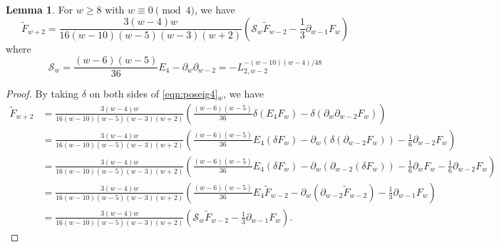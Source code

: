 \documentclass[10pt,reqno]{amsproc}
\newcommand{\1}{\mathds{1}}	%
\theoremstyle{definition}
\newtheorem{lemma}[theorem]{Lemma}
\theoremstyle{remark}
\begin{document}
\begin{lemma}
    \label{lem:Ftilde_rec}
    For $w \geq 8$ with $w \equiv 0 \pmod{4}$, we have
    \begin{equation}
        \label{eqn:Ftilde_rec}
        \widetilde{F}_{w+2} = \frac{3(w-4)w}{16(w-10)(w-5)(w-3)(w+2)} \left(\mathcal{S}_w \widetilde{F}_{w-2} - \frac{1}{3} \partial_{w-1} F_{w}\right)
    \end{equation}
    where
    \begin{equation}
        \label{eqn:S_w}
        \mathcal{S}_w = \frac{(w-6)(w-5)}{36} E_4 - \partial_w \partial_{w-2} = -L_{2,w-2}^{-(w-10)(w-4)/48}
    \end{equation}
\end{lemma}
\begin{proof}
    By taking $\delta$ on both sides of \eqref{eqn:poseig4}$_{w}$, we have
    \begin{align*}
    \widetilde{F}_{w+2} &= \frac{3(w-4)w}{16(w-10)(w-5)(w-3)(w+2)} \left(\frac{(w-6)(w-5)}{36} \delta(E_4 F_w) - \delta (\partial_w \partial_{w-2} F_w)\right) \\
    &= \frac{3(w-4)w}{16(w-10)(w-5)(w-3)(w+2)} \left(\frac{(w-6)(w-5)}{36} E_4 (\delta F_w) - \partial_w(\delta (\partial_{w-2} F_w)) - \frac{1}{6} \partial_{w-2} F_w\right) \\
    &= \frac{3(w-4)w}{16(w-10)(w-5)(w-3)(w+2)} \left(\frac{(w-6)(w-5)}{36} E_4 (\delta F_w) - \partial_w(\partial_{w-2} (\delta F_w)) - \frac{1}{6} \partial_w F_w - \frac{1}{6} \partial_{w-2} F_w\right) \\
    &= \frac{3(w-4)w}{16(w-10)(w-5)(w-3)(w+2)} \left(\frac{(w-6)(w-5)}{36} E_4 \widetilde{F}_{w-2} - \partial_w(\partial_{w-2} \widetilde{F}_{w-2}) - \frac{1}{3} \partial_{w-1} F_w\right) \\
    &= \frac{3(w-4)w}{16(w-10)(w-5)(w-3)(w+2)} \left(\mathcal{S}_w \widetilde{F}_{w-2} - \frac{1}{3} \partial_{w-1} F_{w}\right).
    \end{align*}
\end{proof}
\end{document}
